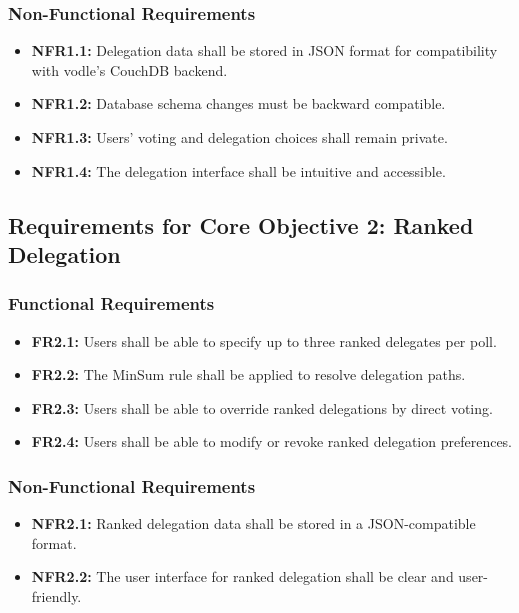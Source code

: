 \subsubsection{Non-Functional Requirements}
\begin{itemize}
    \item \textbf{NFR1.1:} Delegation data shall be stored in JSON format for compatibility with vodle's CouchDB backend.
    \item \textbf{NFR1.2:} Database schema changes must be backward compatible.
    \item \textbf{NFR1.3:} Users' voting and delegation choices shall remain private.
    \item \textbf{NFR1.4:} The delegation interface shall be intuitive and accessible.
\end{itemize}

\subsection{Requirements for Core Objective 2: Ranked Delegation}\label{req_ranked}
\subsubsection{Functional Requirements}
\begin{itemize}
    \item \textbf{FR2.1:} Users shall be able to specify up to three ranked delegates per poll.
    \item \textbf{FR2.2:} The MinSum rule shall be applied to resolve delegation paths.
    \item \textbf{FR2.3:} Users shall be able to override ranked delegations by direct voting.
    \item \textbf{FR2.4:} Users shall be able to modify or revoke ranked delegation preferences.
\end{itemize}

\subsubsection{Non-Functional Requirements}
\begin{itemize}
    \item \textbf{NFR2.1:} Ranked delegation data shall be stored in a JSON-compatible format.
    \item \textbf{NFR2.2:} The user interface for ranked delegation shall be clear and user-friendly.
\end{itemize}

